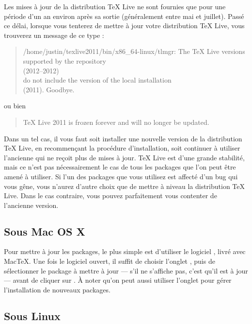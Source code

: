 \begin{attention}
    Les mises à jour de la distribution TeX Live ne sont fournies que pour une période d'un an environ après sa sortie (généralement entre mai et juillet). Passé ce délai, lorsque vous tenterez de mettre à jour votre distribution TeX Live, vous trouverez un message de ce type :

    \begin{quotation}
/home/justin/texlive2011/bin/x86\_64-linux/tlmgr: The TeX Live versions supported by the repository\\
  (2012--2012)\\
do not include the version of the local installation\\
  (2011).  Goodbye.
    \end{quotation}
    
    ou bien
    
    \begin{quotation}
    TeX Live 2011 is frozen forever and will no
longer be updated.
	\end{quotation}

Dans un tel cas,  il vous faut soit installer une nouvelle version de la distribution TeX Live, en recommençant la procédure d'installation, soit continuer à utiliser l'ancienne qui ne reçoit plus de mises à jour. TeX Live est d'une grande stabilité, mais ce n'est pas nécessairement le cas de tous les packages que l'on peut être amené à utiliser. Si l'un des packages que vous utilisez est affecté d'un bug qui vous gêne, vous n'aurez d'autre choix que de mettre à niveau la distribution TeX Live. Dans le cas contraire, vous pouvez parfaitement vous contenter de l'ancienne version.
\end{attention}

\subsection{Sous Mac OS X}\label{majosX}

Pour mettre à jour les packages, le plus simple est d'utiliser le logiciel , livré avec MacTeX. Une fois le logiciel ouvert, il suffit  de choisir l'onglet , puis de sélectionner le package à mettre à jour --- s'il ne s'affiche pas, c'est qu'il est à jour --- avant de cliquer sur . À noter qu'on peut aussi utiliser l'onglet  pour gérer l'installation de nouveaux packages.

\subsection{Sous Linux}

